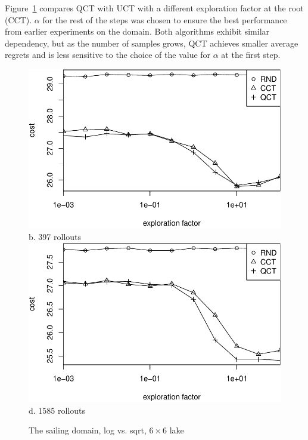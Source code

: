 \documentclass[letterpaper]{article}
\begin{document}
Figure~\ref{fig:sailing-rcq-vs-factor} compares QCT with UCT with a
different exploration factor at the root (CCT). $\alpha$ for the rest of
the steps was chosen to ensure the best performance from earlier
experiments on the domain. Both algorithms exhibit similar dependency,
but as the number of samples grows, QCT achieves smaller average
regrets and is less sensitive to the choice of the value for $\alpha$ at
the first step.
\begin{figure}[h!]
  \centering
  \includegraphics[scale=0.45]{rcq-size=6-nsamples=397.pdf}\\
  b. 397 rollouts\\
  \vspace{1em}
  \includegraphics[scale=0.45]{rcq-size=6-nsamples=1585.pdf}\\
  d. 1585 rollouts\\
  \caption{The sailing domain, log vs. sqrt, $6\times 6$ lake}
  \label{fig:sailing-rcq-vs-factor}
\end{figure}
\end{document}
